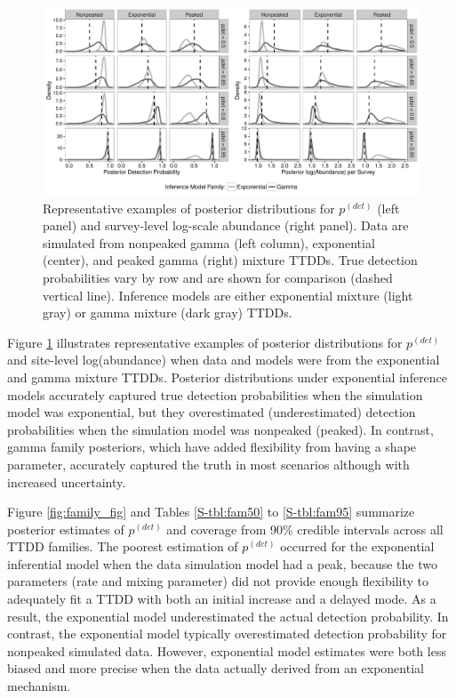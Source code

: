 \documentclass[12pt]{article}
\newcommand{\pdet}{p^{(det)}}
\begin{document}
\begin{figure}\centering
\includegraphics[width=\textwidth]{"Sims/SimZero/Posteriors_Families_draft"} %
\caption{\label{fig:sim2typical} 
Representative examples of posterior distributions for $\pdet$ (left panel) and survey-level log-scale abundance (right panel).
Data are simulated from nonpeaked gamma (left column), exponential (center), and peaked gamma (right) mixture TTDDs.
True detection probabilities vary by row and are shown for comparison (dashed vertical line).
Inference models are either exponential mixture (light gray) or gamma mixture (dark gray) TTDDs.
}
\end{figure}

Figure \ref{fig:sim2typical} illustrates representative examples of posterior distributions for $\pdet$ and site-level log(abundance) when data and models were from the exponential and gamma mixture TTDDs. 
Posterior distributions under exponential inference models accurately captured true detection probabilities when the simulation model was exponential, but they overestimated (underestimated) detection probabilities when the simulation model was nonpeaked (peaked).
In contrast, gamma family posteriors, which have added flexibility from having a shape parameter, accurately captured the truth in most scenarios although with increased uncertainty. 

Figure \ref{fig:family_fig} and Tables \ref{S-tbl:fam50} to \ref{S-tbl:fam95} summarize posterior estimates of $\pdet$ and coverage from 90\% credible intervals across all TTDD families.
The poorest estimation of $\pdet$ occurred for the exponential inferential model when the data simulation model had a peak, because the two parameters (rate and mixing parameter) did not provide enough flexibility to adequately fit a TTDD with both an initial increase and a delayed mode. 
As a result, the exponential model underestimated the actual detection probability.
In contrast, the exponential model typically overestimated detection probability for nonpeaked simulated data.
However, exponential model estimates were both less biased and more precise when the data actually derived from an exponential mechanism.
\end{document}
